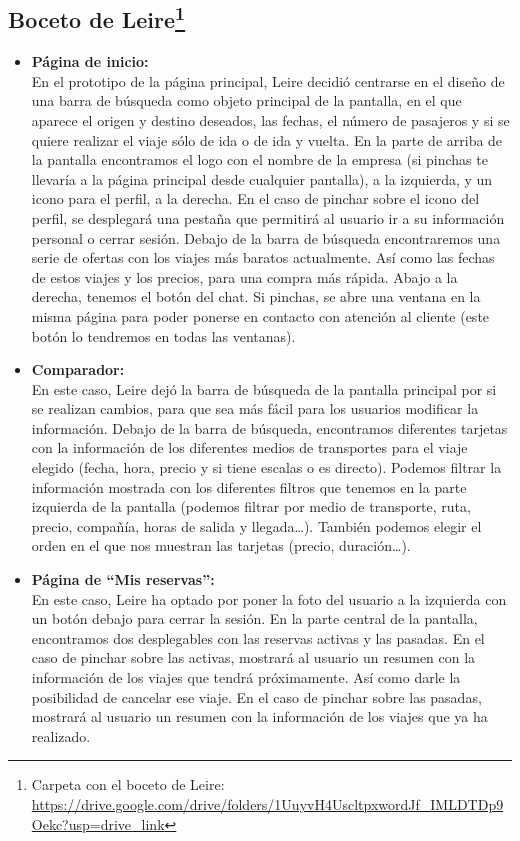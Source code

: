 \subsection[Boceto de Leire]{Boceto de Leire\footnote{Carpeta con el boceto de Leire: \url{https://drive.google.com/drive/folders/1UuyvH4UscltpxwordJf_IMLDTDp9Oekc?usp=drive_link}}}

\begin{itemize}
      \item\textbf{Página de inicio:} \\ En el prototipo de la página principal, Leire decidió centrarse en el diseño de una barra de búsqueda como objeto principal de la pantalla, en el que aparece el origen y destino deseados, las fechas, el número de pasajeros y si se quiere realizar el viaje sólo de ida o de ida y vuelta.
            En la parte de arriba de la pantalla encontramos el logo con el nombre de la empresa (si pinchas te llevaría a la página principal desde cualquier pantalla), a la izquierda, y un icono para el perfil, a la derecha.
            En el caso de pinchar sobre el icono del perfil, se desplegará una pestaña que permitirá al usuario ir a su información personal o cerrar sesión.
            Debajo de la barra de búsqueda encontraremos una serie de ofertas con los viajes más baratos actualmente. Así como las fechas de estos viajes y los precios, para una compra más rápida.
            Abajo a la derecha, tenemos el botón del chat. Si pinchas, se abre una ventana en la misma página para poder ponerse en contacto con atención al cliente (este botón lo tendremos en todas las ventanas).

      \item\textbf{Comparador:} \\
            En este caso, Leire dejó la barra de búsqueda de la pantalla principal por si se realizan cambios, para que sea más fácil para los usuarios modificar la información.
            Debajo de la barra de búsqueda, encontramos diferentes tarjetas con la información de los diferentes medios de transportes para el viaje elegido (fecha, hora, precio y si tiene escalas o es directo). Podemos filtrar la información mostrada con los diferentes filtros que tenemos en la parte izquierda de la pantalla (podemos filtrar por medio de transporte, ruta, precio, compañía, horas de salida y llegada…). También podemos elegir el orden en el que nos muestran las tarjetas (precio, duración…).

      \item\textbf{Página de ``Mis reservas'':} \\ En este caso, Leire ha optado por poner la foto del usuario a la izquierda con un botón debajo para cerrar la sesión.
            En la parte central de la pantalla, encontramos dos desplegables con las reservas activas y las pasadas.
            En el caso de pinchar sobre las activas, mostrará al usuario un resumen con la información de los viajes que tendrá próximamente. Así como darle la posibilidad de cancelar ese viaje.
            En el caso de pinchar sobre las pasadas, mostrará al usuario un resumen con la información de los viajes que ya ha realizado.


\end{itemize}
